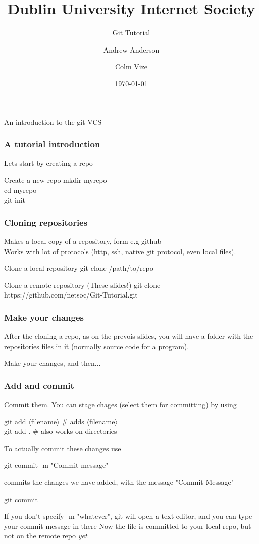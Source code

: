\documentclass[xcolor=dvipsnames]{beamer}
\begin{document}
\title[Netsoc Git Tutorial] {Dublin University Internet Society}
\author[A. Anderson \& C. Vize]{Andrew Anderson  \and Colm Vize }
\subtitle{Git Tutorial}{An introduction to the git VCS}
\date{\today}
\titlepage

\begin{frame}
	\frametitle{A tutorial introduction}

	Lets start by creating a repo
	\begin{block}{Create a new repo}
		mkdir myrepo\\
		cd myrepo\\
		git init
	\end{block}
\end{frame}

\begin{frame}
	\frametitle{Cloning repositories}
	Makes a local copy of a repository, form e.g github\\
	Works with lot of protocols (http, ssh, native git protocol, even local files).

	\begin{block}{Clone a local repository}
		git clone /path/to/repo
	\end{block}
	\begin{block}{Clone a remote repository (These slides!)}
		git clone https://github.com/netsoc/Git-Tutorial.git
	\end{block}
\end{frame}

\begin{frame}
	\frametitle{Make your changes}
	After the cloning a repo, as on the prevois slides, you will have a folder with the repositories
	files in it (normally source code for a program).

	Make your changes, and then...
\end{frame}

\begin{frame}
	\frametitle{Add and commit}
	Commit them.
	You can stage chages (select them for committing) by using
	\begin{block}{}
		git add $\langle$filename$\rangle$ \# adds $\langle$filename$\rangle$\\
		git add . \# also works on directories
	\end{block}
	To actually commit these changes use
	\begin{block}{}
		git commit -m "Commit message"
	\end{block}
	commits the changes we have added, with the message "Commit Message"\\
	
	\begin{block}{}	
		git commit
	\end{block}
 	If you don't specify -m "whatever", git will open a text editor, and you can type your commit message in there 
	Now the file is committed to your local repo, but not on the remote repo \emph{yet}.
\end{frame}
\end{document}
